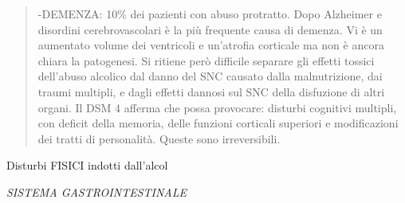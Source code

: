 \documentclass[]{article}
\begin{document}
\begin{quote}
-DEMENZA: 10\% dei pazienti con abuso protratto. Dopo Alzheimer e
disordini cerebrovascolari è la più frequente causa di demenza. Vi è un
aumentato volume dei ventricoli e un'atrofia corticale ma non è ancora
chiara la patogenesi. Si ritiene però difficile separare gli effetti
tossici dell'abuso alcolico dal danno del SNC causato dalla
malnutrizione, dai traumi multipli, e dagli effetti dannosi sul SNC
della disfuzione di altri organi. Il DSM 4 afferma che possa provocare:
disturbi cognitivi multipli, con deficit della memoria, delle funzioni
corticali superiori e modificazioni dei tratti di personalità. Queste
sono irreversibili.
\end{quote}

Disturbi FISICI indotti dall'alcol

\emph{SISTEMA GASTROINTESTINALE}
\end{document}
